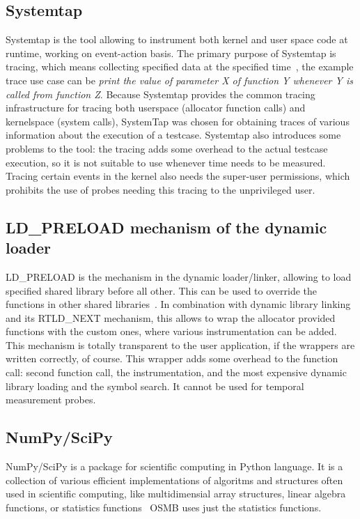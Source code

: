 \subsection{Systemtap}
Systemtap is the tool allowing to instrument both kernel and user space code at runtime, working on event-action basis. The primary purpose of Systemtap is tracing, which means collecting specified data at the specified time~\cite{tools:systemtap, tools:systemtap-redbook, tools:systemtap-bg}, the example trace use case can be {\em print the value of parameter X of function Y whenever Y is called from function Z}. Because Systemtap provides the common tracing infrastructure for tracing both userspace (allocator function calls) and kernelspace (system calls), SystemTap was chosen for obtaining traces of various information about the execution of a testcase.
Systemtap also introduces some problems to the tool: the tracing adds some overhead to the actual testcase execution, so it is not suitable to use whenever time needs to be measured. Tracing certain events in the kernel also needs the super-user permissions, which prohibits the use of probes needing this tracing to the unprivileged user.

\subsection{LD\_PRELOAD mechanism of the dynamic loader}
LD\_PRELOAD is the mechanism in the dynamic loader/linker, allowing to load specified shared library before all other. This can be used to override the functions in other shared libraries~\cite{man-ld}. In combination with dynamic library linking and its RTLD\_NEXT mechanism, this allows to wrap the allocator provided functions with the custom ones, where various instrumentation can be added. This mechanism is totally transparent to the user application, if the wrappers are written correctly, of course. This wrapper adds some overhead to the function call: second function call, the instrumentation, and the most expensive dynamic library loading and the symbol search. It cannot be used for temporal measurement probes.

\subsection{NumPy/SciPy}

NumPy/SciPy is a package for scientific computing in Python language. It is a collection of various efficient implementations of algoritms and structures often used in scientific computing, like multidimensial array structures, linear algebra functions, or statistics functions~\cite{scipy-statistics} OSMB uses just the statistics functions.

